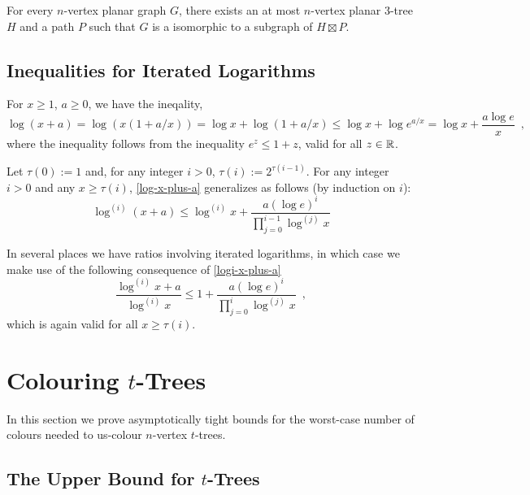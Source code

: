 \documentclass[kpfonts]{patmorin}
\theoremstyle{named}
\begin{document}
\begin{thm}\cite{dujmovic.joret.ea:planar}\label{product-structure}
    For every $n$-vertex planar graph $G$, there exists an at most $n$-vertex planar 3-tree $H$ and a path $P$ such that $G$ is a isomorphic to a subgraph of $H\boxtimes P$.
\end{thm}

\subsection{Inequalities for Iterated Logarithms}

For $x\ge 1$, $a\ge 0$, we have the ineqality,
\begin{equation}
    \log (x+a) = \log (x(1+a/x)) = \log x + \log(1+a/x) \le \log x + \log e^{a/x} = \log x + \frac{a\log e}{x} \enspace , \label{log-x-plus-a}
\end{equation}
where the inequality follows from the inequality $e^z \le 1+z$, valid for all $z\in\mathbb{R}$.

Let $\tau(0):=1$ and, for any integer $i>0$, $\tau(i):=2^{\tau(i-1)}$. For any integer $i>0$ and any $x\ge \tau(i)$, \cref{log-x-plus-a} generalizes as follows (by induction on $i$):
\begin{equation}
    \log^{(i)}(x+a) \le \log^{(i)} x + \frac{a(\log e)^i}{\prod_{j=0}^{i-1}\log^{(j)} x} \label{logi-x-plus-a}
\end{equation}

In several places we have ratios involving iterated logarithms, in which case we make use of the following consequence of \cref{logi-x-plus-a}
\begin{equation}
    \frac{\log^{(i)} x+a}{\log^{(i)} x} \le 1 + \frac{a(\log e)^i}{\prod_{j=0}^{i}\log^{(j)} x} \enspace, \label{logi-ratio}
\end{equation}
which is again valid for all $x\ge \tau(i)$.

\section{Colouring $t$-Trees}

In this section we prove asymptotically tight bounds for the worst-case number of colours needed to us-colour $n$-vertex $t$-trees.

\subsection{The Upper Bound for $t$-Trees}
\end{document}
